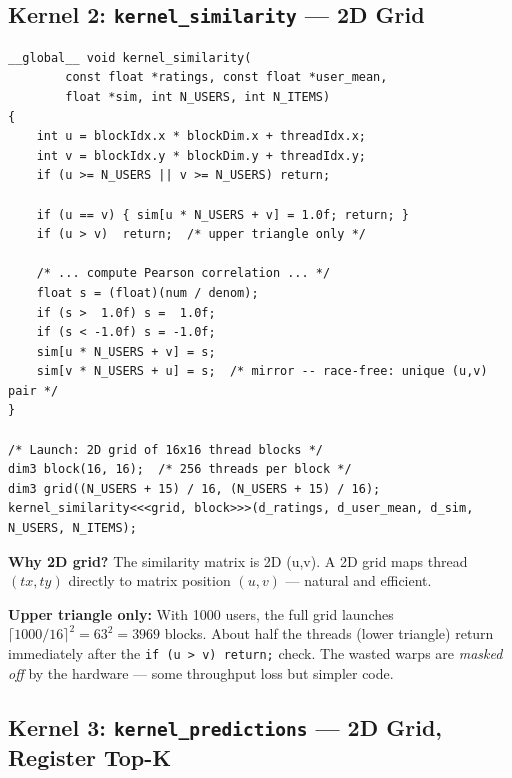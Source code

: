 \documentclass[12pt,a4paper]{article}
\begin{document}
\subsection{Kernel 2: \texttt{kernel\_similarity} — 2D Grid}

\begin{lstlisting}
__global__ void kernel_similarity(
        const float *ratings, const float *user_mean,
        float *sim, int N_USERS, int N_ITEMS)
{
    int u = blockIdx.x * blockDim.x + threadIdx.x;
    int v = blockIdx.y * blockDim.y + threadIdx.y;
    if (u >= N_USERS || v >= N_USERS) return;

    if (u == v) { sim[u * N_USERS + v] = 1.0f; return; }
    if (u > v)  return;  /* upper triangle only */

    /* ... compute Pearson correlation ... */
    float s = (float)(num / denom);
    if (s >  1.0f) s =  1.0f;
    if (s < -1.0f) s = -1.0f;
    sim[u * N_USERS + v] = s;
    sim[v * N_USERS + u] = s;  /* mirror -- race-free: unique (u,v) pair */
}

/* Launch: 2D grid of 16x16 thread blocks */
dim3 block(16, 16);  /* 256 threads per block */
dim3 grid((N_USERS + 15) / 16, (N_USERS + 15) / 16);
kernel_similarity<<<grid, block>>>(d_ratings, d_user_mean, d_sim, N_USERS, N_ITEMS);
\end{lstlisting}

\textbf{Why 2D grid?}  The similarity matrix is 2D (u,v).  A 2D grid maps
thread $(tx, ty)$ directly to matrix position $(u, v)$ — natural and efficient.

\textbf{Upper triangle only:}  With 1000 users, the full grid launches
$\lceil1000/16\rceil^2 = 63^2 = 3969$ blocks.  About half the threads
(lower triangle) return immediately after the \texttt{if (u > v) return;}
check.  The wasted warps are \emph{masked off} by the hardware — some
throughput loss but simpler code.

\subsection{Kernel 3: \texttt{kernel\_predictions} — 2D Grid, Register Top-K}
\end{document}
